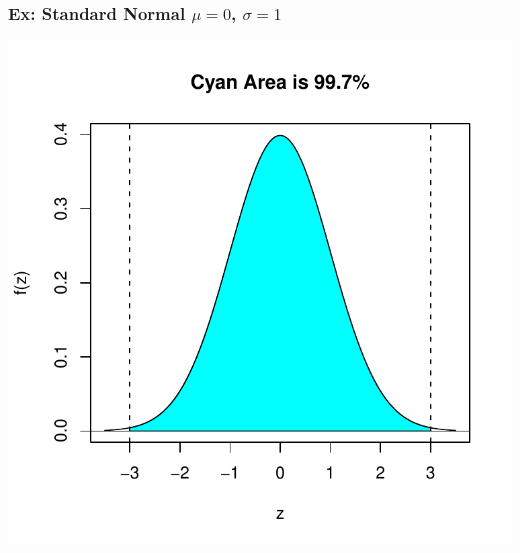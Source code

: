 \documentclass[handout]{beamer}
\begin{document}
\begin{frame}
\frametitle{Ex: Standard Normal $\mu=0$, $\sigma=1$}
\begin{center}
\includegraphics{figure/lec07-003}
\end{center}
\end{frame}
\end{document}

